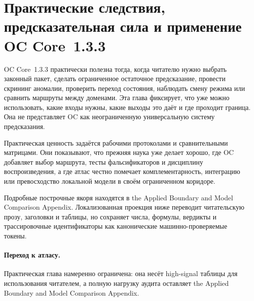 \section{Практические следствия, предсказательная сила и применение OC Core~1.3.3}
\label{sec:oc-core-1-3-practical-utility}
\label{sec:oc-core-1-3-practical-utility-ru}

OC Core~1.3.3 практически полезна тогда, когда читателю нужно выбрать законный
пакет, сделать ограниченное остаточное предсказание, провести скрининг
аномалии, проверить переход состояния, наблюдать смену режима или сравнить
маршруты между доменами. Эта глава фиксирует, что уже можно использовать,
какие входы нужны, какие выходы это даёт и где проходит граница. Она не
представляет OC как неограниченную универсальную систему предсказания.

Практическая ценность задаётся рабочими протоколами и сравнительными матрицами. Они
показывают, что прежняя наука уже делает хорошо, где OC добавляет выбор
маршрута, тесты фальсификаторов и дисциплину воспроизведения, а где атлас честно
помечает комплементарность, интеграцию или превосходство локальной модели в
своём ограниченном коридоре.

Подробные построчные якоря находятся в
the Applied Boundary and Model Comparison Appendix. Локализованная
проекция ниже переводит читательскую прозу, заголовки и таблицы, но сохраняет
числа, формулы, вердикты и трассировочные идентификаторы как канонические
машинно-проверяемые токены.

\begingroup
\small

\endgroup

\paragraph{Переход к атласу.}
Практическая глава намеренно ограничена: она несёт high-signal таблицы для
использования читателем, а полную нагрузку аудита оставляет
the Applied Boundary and Model Comparison Appendix.
